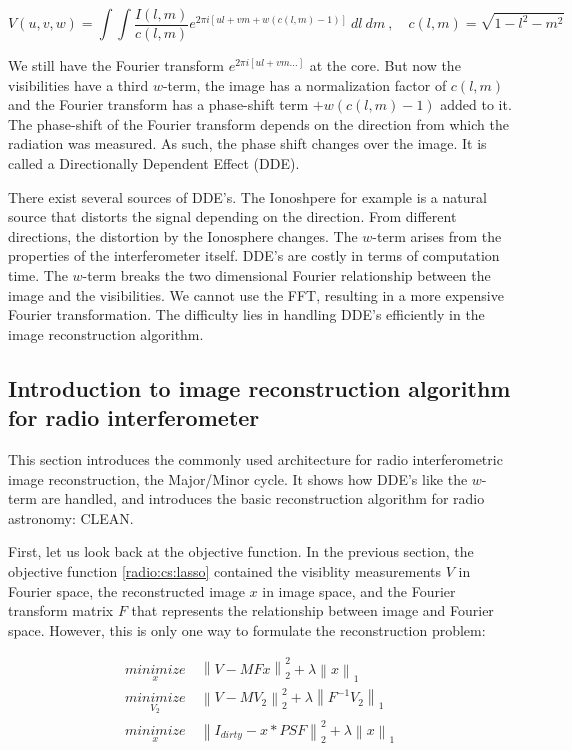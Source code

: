 \begin{equation}\label{intro2:model:widefov}
V(u, v, w) = \int\int  \frac{I(l, m)}{c(l, m)}  e^{2 \pi i [ul+vm + w(c(l, m) - 1)]} \: dl \: dm \:,  \quad c(l,m) = \sqrt{1 - l^2 - m ^2}
\end{equation} 

We still have the Fourier transform $ e^{2 \pi i [ul+vm \ldots]}$ at the core. But now the visibilities have a third $w$-term, the image has a normalization factor of $c(l, m)$ and the Fourier transform has a phase-shift term $+ w(c(l, m) - 1)$ added to it. The phase-shift of the Fourier transform depends on the direction from which the radiation was measured. As such, the phase shift changes over the image. It is called a Directionally Dependent Effect (DDE).

There exist several sources of DDE's. The Ionoshpere for example is a natural source that distorts the signal depending on the direction. From different directions, the distortion by the Ionosphere changes. The $w$-term arises from the properties of the interferometer itself. DDE's are costly in terms of computation time. The $w$-term breaks the two dimensional Fourier relationship between the image and the visibilities. We cannot use the FFT, resulting in a more expensive Fourier transformation. The difficulty lies in handling DDE's efficiently in the image reconstruction algorithm.


\subsection{Introduction to image reconstruction algorithm for radio interferometer}\label{intro2:rec}
This section introduces the commonly used architecture for radio interferometric image reconstruction, the Major/Minor cycle. It shows how DDE's like the $w$-term are handled, and introduces the basic reconstruction algorithm for radio astronomy: CLEAN.

First, let us look back at the objective function. In the previous section, the objective function \eqref{radio:cs:lasso} contained the visiblity measurements $V$ in Fourier space, the reconstructed image $x$ in image space, and the Fourier transform matrix $F$ that represents the relationship between image and Fourier space. However, this is only one way to formulate the reconstruction problem:

\begin{equation} \label{radio:rec:objective}
\begin{split}
\underset{x}{minimize} &\: \left \| V - MFx \right \|_2^2 + \lambda \left \| x \right \|_1 \\
\underset{V_2}{minimize} &\: \left \| V - MV_2 \right \|_2^2 + \lambda \left \| F^{-1}V_2 \right \|_1 \\
\underset{x}{minimize} &\: \left \| I_{dirty} - x * PSF \right \|_2^2 + \lambda \left \| x \right \|_1
\end{split}
\end{equation}

